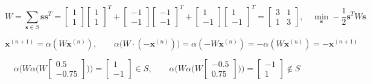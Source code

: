 \begin{equation}
    W = \sum_{\bm{s} \in S}{\bm{s}\bm{s}^T} = \begin{bmatrix}
        1 \\ 1
    \end{bmatrix} \begin{bmatrix}
        1 \\ 1
    \end{bmatrix}^T + \begin{bmatrix}
        -1 \\ -1
    \end{bmatrix} \begin{bmatrix}
        -1 \\ -1
    \end{bmatrix}^T + \begin{bmatrix}
        1 \\ -1
    \end{bmatrix} \begin{bmatrix}
        1 \\ -1
    \end{bmatrix}^T = \begin{bmatrix}
        3 & 1 \\
        1 & 3
    \end{bmatrix}
    , \quad
    \min_{\bm{s}} -\frac{1}{2}\bm{s}^T W \bm{s}
\end{equation}

\begin{equation}
    \bm{x}^{(n+1)} = \alpha(W \bm{x}^{(n)})
    , \qquad
    \alpha \big(W \cdot (-\bm{x}^{(n)}) \big) = \alpha (- W \bm{x}^{(n)}) = - \alpha(W \bm{x}^{(n)}) = - \bm{x}^{(n+1)}
    \label{eq:symmetric-attractors-update-rule}
\end{equation}

\begin{equation}
    \alpha \bigg( W \alpha \Big( W \begin{bmatrix}
        0.5 \\ -0.75
    \end{bmatrix} \Big) \bigg) = \begin{bmatrix}
        1 \\ -1
    \end{bmatrix} \in S
    , \qquad
    \alpha \bigg( W \alpha \Big( W \begin{bmatrix}
        -0.5 \\ 0.75
    \end{bmatrix} \Big) \bigg) = \begin{bmatrix}
        -1 \\ 1
    \end{bmatrix} \notin S
    \label{eq:symmetric-attractors-update-rule-example}
\end{equation}

